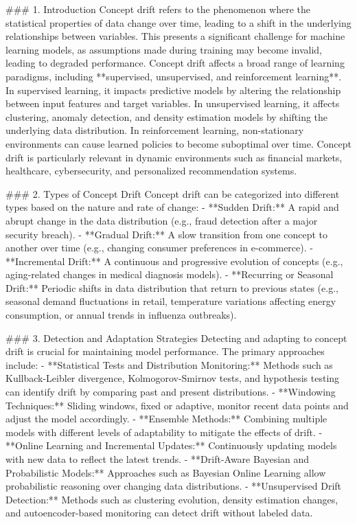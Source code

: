 \documentclass[12pt]{article}
\begin{document}
### 1. Introduction
Concept drift refers to the phenomenon where the statistical properties of data
change over time, leading to a shift in the underlying relationships between
variables. This presents a significant challenge for machine learning models,
as assumptions made during training may become invalid, leading to degraded
performance. Concept drift affects a broad range of learning paradigms,
including **supervised, unsupervised, and reinforcement learning**. In
supervised learning, it impacts predictive models by altering the relationship
between input features and target variables. In unsupervised learning, it
affects clustering, anomaly detection, and density estimation models by
shifting the underlying data distribution. In reinforcement learning,
non-stationary environments can cause learned policies to become suboptimal
over time. Concept drift is particularly relevant in dynamic environments such
as financial markets, healthcare, cybersecurity, and personalized
recommendation systems.

### 2. Types of Concept Drift
Concept drift can be categorized into different types based on the nature and
rate of change:
- **Sudden Drift:** A rapid and abrupt change in the data distribution (e.g.,
fraud detection after a major security breach).
- **Gradual Drift:** A slow transition from one concept to another over time
(e.g., changing consumer preferences in e-commerce).
- **Incremental Drift:** A continuous and progressive evolution of concepts
(e.g., aging-related changes in medical diagnosis models).
- **Recurring or Seasonal Drift:** Periodic shifts in data distribution that
return to previous states (e.g., seasonal demand fluctuations in retail,
temperature variations affecting energy consumption, or annual trends in
influenza outbreaks).

### 3. Detection and Adaptation Strategies
Detecting and adapting to concept drift is crucial for maintaining model
performance. The primary approaches include:
- **Statistical Tests and Distribution Monitoring:** Methods such as
Kullback-Leibler divergence, Kolmogorov-Smirnov tests, and hypothesis testing
can identify drift by comparing past and present distributions.
- **Windowing Techniques:** Sliding windows, fixed or adaptive, monitor recent
data points and adjust the model accordingly.
- **Ensemble Methods:** Combining multiple models with different levels of
adaptability to mitigate the effects of drift.
- **Online Learning and Incremental Updates:** Continuously updating models
with new data to reflect the latest trends.
- **Drift-Aware Bayesian and Probabilistic Models:** Approaches such as
Bayesian Online Learning allow probabilistic reasoning over changing data
distributions.
- **Unsupervised Drift Detection:** Methods such as clustering evolution,
density estimation changes, and autoencoder-based monitoring can detect drift
without labeled data.
\end{document}

